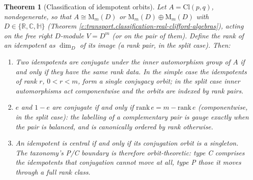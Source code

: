 \documentclass[11pt]{article}
\newtheorem{theorem}{Theorem}[section]
\theoremstyle{definition}
\theoremstyle{plain}
\newcommand{\changedmark}[2]{\marginpar{\raggedright\scriptsize\color{#1}#2}}
\providecommand{\C}{}\renewcommand{\C}{\mathbb{C}}
\providecommand{\Cl}{}\renewcommand{\Cl}{\mathrm{Cl}}
\providecommand{\HH}{}\renewcommand{\HH}{\mathbb{H}}
\providecommand{\Mat}{}\renewcommand{\Mat}{\mathrm{M}}
\providecommand{\R}{}\renewcommand{\R}{\mathbb{R}}
\begin{document}
\begin{theorem}[Classification of idempotent orbits]\label{c:transport.classification-idempotent-orbits}
\changedmark{gray}{reworded}
Let $A = \Cl(p,q)$, nondegenerate, so that $A \cong \Mat_m(D)$ or $\Mat_m(D) \oplus \Mat_m(D)$ with $D \in \{\R, \C, \HH\}$ (Theorem \ref{c:transport.classification-real-clifford-algebras}), acting on the free right $D$-module $V = D^m$ (or on the pair of them). Define the \emph{rank} of an idempotent as $\dim_D$ of its image (a rank pair, in the split case). Then:
\begin{enumerate}
\item Two idempotents are conjugate under the inner automorphism group of $A$ if and only if they have the same rank data. In the simple case the idempotents of rank $r$, $0 < r < m$, form a single conjugacy orbit; in the split case inner automorphisms act componentwise and the orbits are indexed by rank pairs.
\item $e$ and $1 - e$ are conjugate if and only if $\mathrm{rank}\, e = m - \mathrm{rank}\, e$ (componentwise, in the split case): the labelling of a complementary pair is gauge exactly when the pair is balanced, and is canonically ordered by rank otherwise.
\item An idempotent is central if and only if its conjugation orbit is a singleton. The taxonomy's P/C boundary is therefore orbit-theoretic: type C comprises the idempotents that conjugation cannot move at all, type P those it moves through a full rank class.
\end{enumerate}
\end{theorem}
\end{document}
